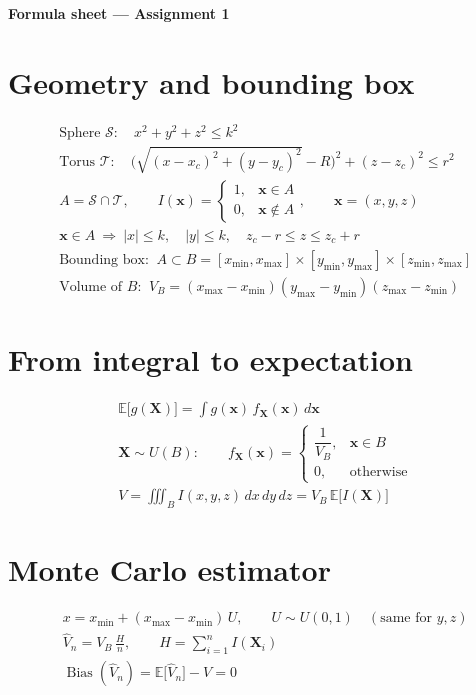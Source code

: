\documentclass[12pt,a4paper,fleqn]{article}
\numberwithin{equation}{section}
\newcommand{\I}{I}
\newcommand{\E}{\mathbb{E}}
\newcommand{\Bias}{\operatorname{Bias}}
\newcommand{\bx}{\mathbf{x}}
\newcommand{\bX}{\mathbf{X}}
\begin{document}
\begin{center}
{\LARGE\bfseries Formula sheet --- Assignment 1}\\[4pt]
\end{center}

\section{Geometry and bounding box}
\begin{align}
&\text{Sphere } \mathcal S:\quad x^2+y^2+z^2\le k^2\\
&\text{Torus } \mathcal T:\quad \Big(\sqrt{(x-x_c)^2+(y-y_c)^2}-R\Big)^2+(z-z_c)^2\le r^2\\
&A=\mathcal S\cap\mathcal T,\qquad
\I(\bx)=\begin{cases}1, & \bx\in A\\ 0, & \bx\notin A\end{cases},\qquad \bx=(x,y,z)\\
&\bx\in A\ \Rightarrow\ |x|\le k,\quad |y|\le k,\quad z_c-r\le z\le z_c+r\\
&\text{Bounding box: }\ A\subset B=[x_{\min},x_{\max}]\times[y_{\min},y_{\max}]\times[z_{\min},z_{\max}]\\
&\text{Volume of } B\text{: }\ V_B=(x_{\max}-x_{\min})(y_{\max}-y_{\min})(z_{\max}-z_{\min})
\end{align}

\section{From integral to expectation}
\begin{align}
&\E\big[g(\bX)\big]=\int g(\bx)\,f_{\bX}(\bx)\,d\bx\\
&\bX\sim U(B):\qquad f_{\bX}(\bx)=\begin{cases}\dfrac{1}{V_B}, & \bx\in B\\[6pt] 0, & \text{otherwise}\end{cases}\\
&V=\iiint_B\I(x,y,z)\,dx\,dy\,dz=V_B\,\E\big[\I(\bX)\big]
\end{align}

\section{Monte Carlo estimator}
\begin{align}
&x=x_{\min}+(x_{\max}-x_{\min})\,U,\qquad U\sim U(0,1)\quad(\text{same for } y,z)\\
&\hat V_n=V_B\,\frac{H}{n},\qquad H=\sum_{i=1}^n\I(\bX_i)\\
&\Bias(\hat V_n)=\E\big[\hat V_n\big]-V=0
\end{align}
\end{document}
